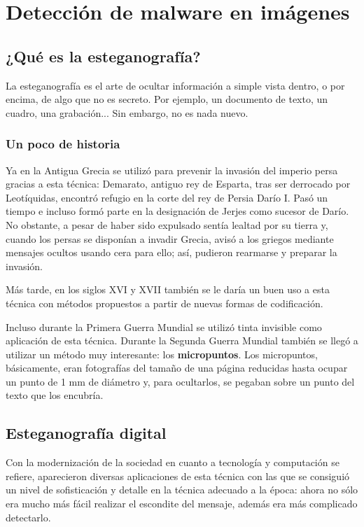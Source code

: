 \chapter{Detección de malware en imágenes}
\label{ch:det_mal}


\section{¿Qué es la esteganografía?}

La esteganografía es el arte de ocultar información a simple vista dentro, o por encima, de algo que no es secreto. Por ejemplo, un documento de texto, un cuadro, una grabación... Sin embargo, no es nada nuevo.%

\subsection{Un poco de historia}

Ya en la Antigua Grecia se utilizó para prevenir la invasión del imperio persa gracias a esta técnica: Demarato, antiguo rey de Esparta, tras ser derrocado por Leotíquidas, encontró refugio en la corte del rey de Persia Darío I. Pasó un tiempo e incluso formó parte en la designación de Jerjes como sucesor de Darío. No obstante, a pesar de haber sido expulsado sentía lealtad por su tierra y, cuando los persas se disponían a invadir Grecia, avisó a los griegos mediante mensajes ocultos usando cera para ello; así, pudieron rearmarse y preparar la invasión. %

Más tarde, en los siglos XVI y XVII también se le daría un buen uso a esta técnica con métodos propuestos a partir de nuevas formas de codificación.%

Incluso durante la Primera Guerra Mundial se utilizó tinta invisible como aplicación de esta técnica. Durante la Segunda Guerra Mundial también se llegó a utilizar un método muy interesante: los \textbf{micropuntos}. Los micropuntos, básicamente, eran fotografías del tamaño de una página reducidas hasta ocupar un punto de 1 mm de diámetro y, para ocultarlos, se pegaban sobre un punto del texto que los encubría. %

\section{Esteganografía digital}

Con la modernización de la sociedad en cuanto a tecnología y computación se refiere, aparecieron diversas aplicaciones de esta técnica con las que se consiguió un nivel de sofisticación y detalle en la técnica adecuado a la época: ahora no sólo era mucho más fácil realizar el escondite del mensaje, además era más complicado detectarlo. %

